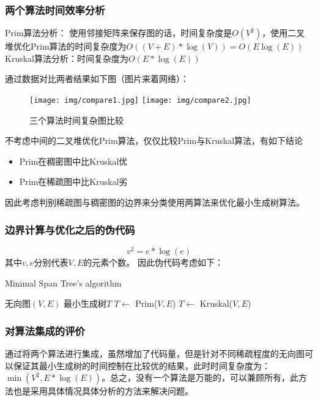 \documentclass[cs4size, punct, nospace, fancyhdr, fntef, UTF8]{ctexart}
\begin{document}
  \subsubsection{两个算法时间效率分析}
  {\heiti Prim算法分析： }使用邻接矩阵来保存图的话，时间复杂度是$O\left(V^2\right)$，使用二叉堆优化Prim算法的时间复杂度为$O((V + E)* \log(V)) = O(E \log(E))$
  {\heiti Kruskal算法分析：}时间复杂度为$O(E*\log (E))$

  通过数据对比两者结果如下图（图片来着网络）：
  \begin{figure}[htbp]  %
    \centering
    \texttt{[image: img/compare1.jpg]}
    \texttt{[image: img/compare2.jpg]}
    \caption[compare]{三个算法时间复杂图比较}\label{fig:compare}
  \end{figure}
  不考虑中间的二叉堆优化Prim算法，仅仅比较Prim与Kruskal算法，有如下结论
  \begin{itemize}
    \item Prim在稠密图中比Kruskal优
    \item Prim在稀疏图中比Kruskal劣
  \end{itemize}
  因此考虑判别稀疏图与稠密图的边界来分类使用两算法来优化最小生成树算法。
  \subsubsection{边界计算与优化之后的伪代码}
  \begin{equation}\label{equ:cmp_rlt}
    v^2 = e*\log(e)
  \end{equation}
  其中$v, e$分别代表$V, E$的元素个数。  因此伪代码考虑如下：
  \begin{algorithm}
    \caption{Minimal Span Tree's algorithm}\label{alg:MinSpanTree}
  \begin{algorithmic}[1]
      \Require 无向图$(V, E)$
      \Ensure 最小生成树$T$
        \State $T \gets$ Prim($V, E$)
      \Else
        \State $T \gets$ Kruskal($V, E$)
      \EndIf
    \EndFunction
    \end{algorithmic}
    \end{algorithm}
  \subsubsection{对算法集成的评价}
  通过将两个算法进行集成，虽然增加了代码量，但是针对不同稀疏程度的无向图可以保证其最小生成树的时间控制在比较优的结果，此时时间复杂度为：$\min (V^2, E * \log(E))$。总之，没有一个算法是万能的，可以兼顾所有，此方法也是采用具体情况具体分析的方法来解决问题。
\end{document}
